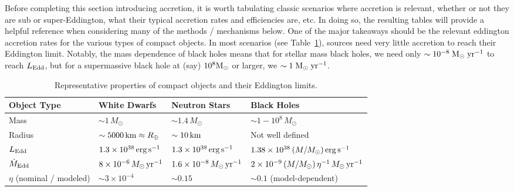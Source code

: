 Before completing this section introducing accretion, it is worth tabulating classic scenarios where accretion is relevant, whether or not they are sub or super-Eddington, what their typical accretion rates and efficiencies are, etc. In doing so, the resulting tables will provide a helpful reference when considering many of the methods / mechanisms below. One of the major takeaways should be the relevant eddington accretion rates for the various types of compact objects. In most scenarios (see Table~\ref{tab:compact-objects}), sources need very little accretion to reach their Eddington limit. Notably, the mass dependence of black holes means that for stellar mass black holes, we need only $\sim 10^{-8} \;{\rm M_\odot \; yr^{-1}}$ to reach $L_{\rm Edd}$, but for a supermassive black hole at (say) $10^{8} {\rm M_\odot}$ or larger, we $\sim 1\;{\rm M_\odot\; yr^{-1}}$.
\begin{table}[h]
    \small
    \centering
    {
    \renewcommand{\arraystretch}{2}
    \begin{tabular}{p{2cm}|p{3cm}p{3cm}p{5cm}}
        \hline
        \textbf{Object Type} & \textbf{White Dwarfs} & \textbf{Neutron Stars} & \textbf{Black Holes} \\
        \hline
        Mass & $\sim 1\,M_\odot$ 
                  & $\sim 1.4\,M_\odot$ 
                  & $\sim 1\!-\!10^{8}\,M_\odot$ \\
                \hline
        Radius & $\sim 5000\,{\rm km} \approx R_\oplus$ 
                    & $\sim 10\,{\rm km}$ 
                    & Not well defined \\
                \hline
        $L_{\rm Edd}$ & $1.3 \times 10^{38}\,{\rm erg\,s^{-1}}$ 
                      & $1.3 \times 10^{38}\,{\rm erg\,s^{-1}}$ 
                      & $1.38 \times 10^{38}\,(M/M_\odot)\,{\rm erg\,s^{-1}}$ \\
                \hline
        $\dot{M}_{\rm Edd}$ & $8 \times 10^{-6}\,M_\odot\,{\rm yr^{-1}}$ 
                            & $1.6 \times 10^{-8}\,M_\odot\,{\rm yr^{-1}}$ 
                            & $2 \times 10^{-9}\,(M/M_\odot)\,\eta^{-1}\,M_\odot\,{\rm yr^{-1}}$ \\
                \hline
        $\eta$ (nominal / modeled) & $\sim 3 \times 10^{-4}$ 
                                   & $\sim 0.15$ 
                                   & $\sim 0.1$ (model-dependent) \\
        \hline
    \end{tabular}
    }
    \caption{Representative properties of compact objects and their Eddington limits.}
    \label{tab:compact-objects}
\end{table}

